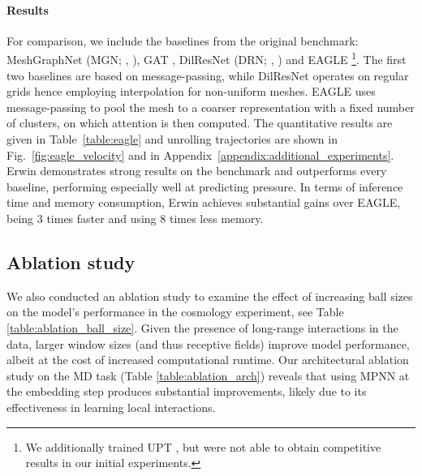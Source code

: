 \paragraph{Results}

For comparison, we include the baselines from the original benchmark: MeshGraphNet (MGN; \citeauthor{Pfaff2020LearningMS}, \citeyear{Pfaff2020LearningMS}), GAT \cite{Velickovic2017GraphAN}, DilResNet (DRN; \citeauthor{Stachenfeld2021LearnedCM}, \citeyear{Stachenfeld2021LearnedCM}) and EAGLE \cite{Janny2023EagleLL}\footnote{We additionally trained UPT \cite{alkin2024upt}, but were not able to obtain competitive results in our initial experiments.}. The first two baselines are based on message-passing, while DilResNet operates on regular grids hence employing interpolation for non-uniform meshes. EAGLE uses message-passing to pool the mesh to a coarser representation with a fixed number of clusters, on which attention is then computed. The quantitative results are given in Table~\ref{table:eagle} and unrolling trajectories are shown in Fig.~\ref{fig:eagle_velocity} and in Appendix~\ref{appendix:additional_experiments}. Erwin demonstrates strong results on the benchmark and outperforms every baseline, performing especially well at predicting pressure. In terms of inference time and memory consumption, Erwin achieves substantial gains over EAGLE, being $3$ times faster and using $8$ times less memory.


\vspace{-5pt}
\subsection{Ablation study}

We also conducted an ablation study to examine the effect of increasing ball sizes on the model's performance in the cosmology experiment, see Table \ref{table:ablation_ball_size}. Given the presence of long-range interactions in the data, larger window sizes (and thus receptive fields) improve model performance, albeit at the cost of increased computational runtime. Our architectural ablation study on the MD task (Table \ref{table:ablation_arch}) reveals that using MPNN at the embedding step produces substantial improvements, likely due to its effectiveness in learning local interactions. 

